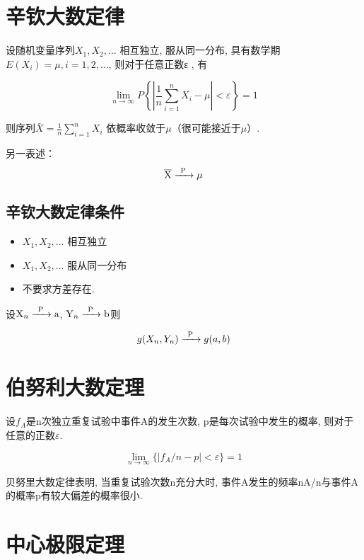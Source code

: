 \section{辛钦大数定律}

\begin{theorem}[辛钦大数定律]
    设随机变量序列$X_1,X_2, …$   相互独立, 服从同一分布, 具有数学期$E(X_i)=\mu, i=1,2,…$,  则对于任意正数ε , 有

$$\lim _{n \rightarrow \infty} P\left\{\left|\frac{1}{n} \sum_{i=1}^{n} X_{i}-\mu\right|<\varepsilon\right\}=1$$

则序列$\bar{X}=\frac{1}{n} \sum_{i=1}^{n} X_{i}$ 依概率收敛于$\mu$（很可能接近于$\mu$）.
\end{theorem}

另一表述：
$$\ce{\overline{X} ->[P] \mu}$$

\subsection{辛钦大数定律条件}

\begin{itemize}
    \item $X_1,X_2, …$ 相互独立
    \item $X_1,X_2, …$ 服从同一分布
    \item 不要求方差存在. 
\end{itemize}

\begin{corollary}
设$\ce{X_n ->[P] a}$, $\ce{Y_n ->[P] b}$则

$$
   g(X_n, Y_n)\ce{->[P]} g(a,b)
$$
\end{corollary}

\section{伯努利大数定理}

\begin{theorem}[伯努利大数定理]
设$f_A$是n次独立重复试验中事件A的发生次数, p是每次试验中发生的概率, 则对于任意的正数$\varepsilon$.

$$
 \lim_{n \to \infty}\{ |f_A/n - p| < \varepsilon\} = 1  
$$
\end{theorem}

贝努里大数定律表明, 当重复试验次数n充分大时, 事件A发生的频率nA/n与事件A的概率p有较大偏差的概率很小.

\section{中心极限定理}

